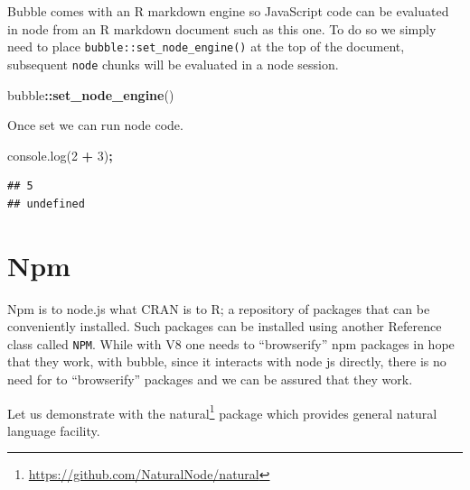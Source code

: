 \documentclass[
]{krantz}
\makeatletter
\newenvironment{Shaded}{\begin{snugshade}}{\end{snugshade}}
\newcommand{\AttributeTok}[1]{\textcolor[rgb]{0.61,0.61,0.61}{#1}}
\newcommand{\CommentTok}[1]{\textcolor[rgb]{0.37,0.37,0.37}{\textit{#1}}}
\newcommand{\DecValTok}[1]{\textcolor[rgb]{0.06,0.06,0.06}{#1}}
\newcommand{\KeywordTok}[1]{\textcolor[rgb]{0.27,0.27,0.27}{\textbf{#1}}}
\newcommand{\NormalTok}[1]{#1}
\newcommand{\OperatorTok}[1]{\textcolor[rgb]{0.43,0.43,0.43}{\textbf{#1}}}
\newcommand{\StringTok}[1]{\textcolor[rgb]{0.5,0.5,0.5}{#1}}
\newcommand{\VariableTok}[1]{\textcolor[rgb]{0,0,0}{#1}}
\renewcommand{\href}[2]{#2\footnote{\url{#1}}}
\newenvironment{kframe}{%
\medskip{}
\setlength{\fboxsep}{.8em}
 \def\at@end@of@kframe{}%
 \ifinner\ifhmode%
  \def\at@end@of@kframe{\end{minipage}}%
  \begin{minipage}{\columnwidth}%
 \fi\fi%
 \def\FrameCommand##1{\hskip\@totalleftmargin \hskip-\fboxsep
 \colorbox{shadecolor}{##1}\hskip-\fboxsep
     \hskip-\linewidth \hskip-\@totalleftmargin \hskip\columnwidth}%
 \MakeFramed {\advance\hsize-\width
   \@totalleftmargin\z@ \linewidth\hsize
   \@setminipage}}%
 {\par\unskip\endMakeFramed%
 \at@end@of@kframe}
\renewenvironment{Shaded}{\begin{kframe}}{\end{kframe}}
\makeatother
\begin{document}
Bubble comes with an R markdown engine so JavaScript code can be evaluated in node from an R markdown document such as this one. To do so we simply need to place \texttt{bubble::set\_node\_engine()} at the top of the document, subsequent \texttt{node} chunks will be evaluated in a node session.

\begin{Shaded}
\begin{Highlighting}[]
\NormalTok{bubble}\OperatorTok{::}\KeywordTok{set\_node\_engine}\NormalTok{()}
\end{Highlighting}
\end{Shaded}

Once set we can run node code.

\begin{Shaded}
\begin{Highlighting}[]
\VariableTok{console}\NormalTok{.}\AttributeTok{log}\NormalTok{(}\DecValTok{2} \OperatorTok{+} \DecValTok{3}\NormalTok{)}\OperatorTok{;}
\end{Highlighting}
\end{Shaded}

\begin{verbatim}
## 5
## undefined
\end{verbatim}

\hypertarget{npm}{%
\section*{Npm}\label{npm}}


Npm is to node.js what CRAN is to R; a repository of packages that can be conveniently installed. Such packages can be installed using another Reference class called \texttt{NPM}. While with V8 one needs to ``browserify'' npm packages in hope that they work, with bubble, since it interacts with node js directly, there is no need for to ``browserify'' packages and we can be assured that they work.

Let us demonstrate with the \href{https://github.com/NaturalNode/natural}{natural} package which provides general natural language facility.

\begin{Shaded}
\end{Shaded}
\end{document}
